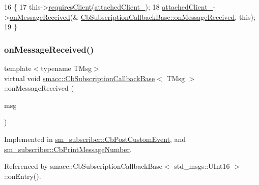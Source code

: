 \begin{DoxyCode}
16   \{
17     this->\hyperlink{classsmacc_1_1ISmaccClientBehavior_a32b16e99e3b4cb289414203dc861a440}{requiresClient}(\hyperlink{classsmacc_1_1CbSubscriptionCallbackBase_af6f6d8dd53447934d90d6d71bdcc10cb}{attachedClient\_});
18     \hyperlink{classsmacc_1_1CbSubscriptionCallbackBase_af6f6d8dd53447934d90d6d71bdcc10cb}{attachedClient\_}->\hyperlink{classsmacc_1_1client__bases_1_1SmaccSubscriberClient_a4f02251e3a161fb6d802b154b1081f18}{onMessageReceived}(&
      \hyperlink{classsmacc_1_1CbSubscriptionCallbackBase_a77d8d3eee701b990277e69804eac0049}{CbSubscriptionCallbackBase::onMessageReceived}, \textcolor{keyword}{this});
19   \}
\end{DoxyCode}
\mbox{\label{classsmacc_1_1CbSubscriptionCallbackBase_a77d8d3eee701b990277e69804eac0049}} 
\subsubsection{\texorpdfstring{on\+Message\+Received()}{onMessageReceived()}}
{\footnotesize\ttfamily template$<$typename T\+Msg$>$ \\
virtual void \hyperlink{classsmacc_1_1CbSubscriptionCallbackBase}{smacc\+::\+Cb\+Subscription\+Callback\+Base}$<$ T\+Msg $>$\+::on\+Message\+Received (\begin{DoxyParamCaption}\item[{const T\+Msg \&}]{msg }\end{DoxyParamCaption})\hspace{0.3cm}{\ttfamily [pure virtual]}}



Implemented in \hyperlink{classsm__subscriber_1_1CbPostCustomEvent_a662b32b373fe517ec7d773b68517c532}{sm\+\_\+subscriber\+::\+Cb\+Post\+Custom\+Event}, and \hyperlink{classsm__subscriber_1_1CbPrintMessageNumber_a8f9a13e3da3fd897354579a31cb9de3f}{sm\+\_\+subscriber\+::\+Cb\+Print\+Message\+Number}.



Referenced by smacc\+::\+Cb\+Subscription\+Callback\+Base$<$ std\+\_\+msgs\+::\+U\+Int16 $>$\+::on\+Entry().

